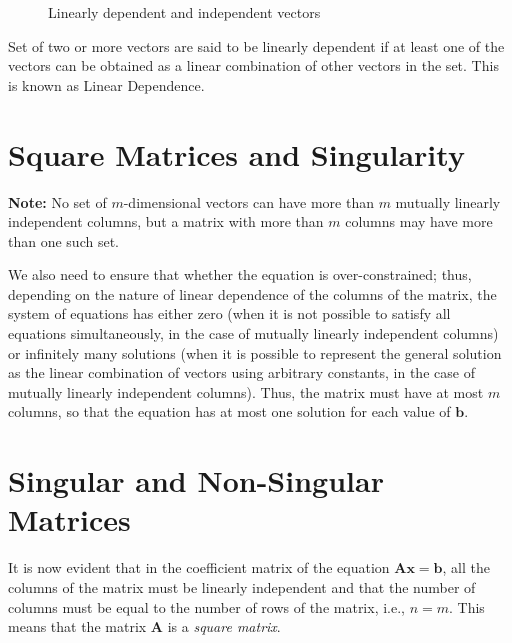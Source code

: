 \para

\begin{figure}[ht]
    \centering
    
    \caption{Linearly dependent and independent vectors}
    \label{Vectors in a 3D space}
\end{figure}

\para


Set of two or more vectors are said to be linearly dependent if at least one of the vectors can be obtained as a linear combination of other vectors in the set. This is known as Linear Dependence.

\clearpage
\newpage

\section{Square Matrices and Singularity}

\textbf{Note:} No set of \(m\)-dimensional vectors can have more than \(m\) mutually linearly independent columns, but a matrix with more than \(m\) columns may have more than one such set.

\para

We also need to ensure that whether the equation is over-constrained; thus, depending on the nature of linear dependence of the columns of the matrix, the system of equations has either zero (when it is not possible to satisfy all equations simultaneously, in the case of mutually linearly independent columns) or infinitely many solutions (when it is possible to represent the general solution as the linear combination of vectors using arbitrary constants, in the case of mutually linearly independent columns). Thus, the matrix must have at most \(m\) columns, so that the equation has at most one solution for each value of \(\mathbf{b}\).

\para

\section{Singular and Non-Singular Matrices}

It is now evident that in the coefficient matrix of the equation \(\mathbf{A}\mathbf{x} = \mathbf{b}\), all the columns of the matrix must be linearly independent and that the number of columns must be equal to the number of rows of the matrix, i.e., \(n = m\). This means that the matrix \(\mathbf{A}\) is a \textit{square matrix}.

